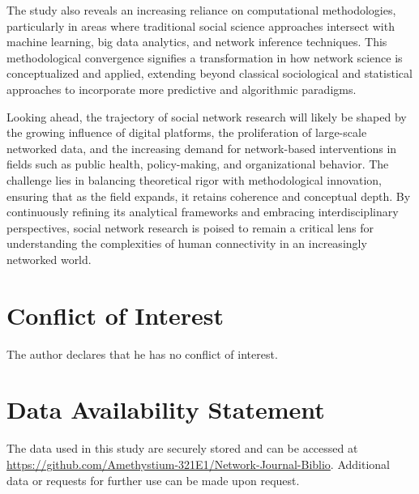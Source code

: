 \documentclass[twocolumn]{article}
\begin{document}
		The study also reveals an increasing reliance on computational methodologies, particularly in areas where traditional social science approaches intersect with machine learning, big data analytics, and network inference techniques. This methodological convergence signifies a transformation in how network science is conceptualized and applied, extending beyond classical sociological and statistical approaches to incorporate more predictive and algorithmic paradigms.
		
		Looking ahead, the trajectory of social network research will likely be shaped by the growing influence of digital platforms, the proliferation of large-scale networked data, and the increasing demand for network-based interventions in fields such as public health, policy-making, and organizational behavior. The challenge lies in balancing theoretical rigor with methodological innovation, ensuring that as the field expands, it retains coherence and conceptual depth. By continuously refining its analytical frameworks and embracing interdisciplinary perspectives, social network research is poised to remain a critical lens for understanding the complexities of human connectivity in an increasingly networked world.\\
		
		\section*{Conflict of Interest}
		\noindent The author declares that he has no conflict of interest.
		\section*{Data Availability Statement}
		\noindent The data used in this study are securely stored and can be accessed at \url{https://github.com/Amethystium-321E1/Network-Journal-Biblio}. Additional data or requests for further use can be made upon request.
		
		
	
	
	
\end{document}
